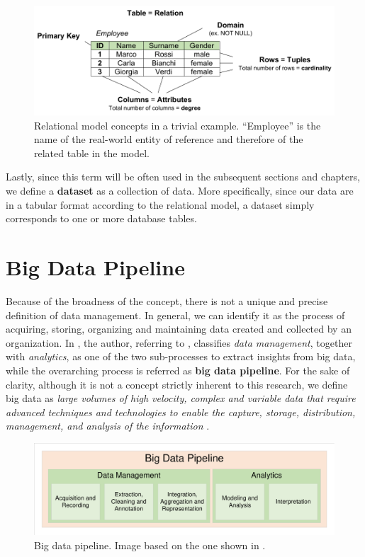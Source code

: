\begin{figure}[h!]
\includegraphics[scale=.75]{figures/relational_model.pdf}
\centering
\caption{Relational model concepts in a trivial example. ``Employee'' is the name of the real-world entity of reference and therefore of the related table in the model.}
\label{fig:relational_model}
\end{figure}

Lastly, since this term will be often used in the subsequent sections and chapters, we define a \textbf{dataset} as a collection of data. More specifically, since our data are in a tabular format according to the relational model, a dataset simply corresponds to one or more database tables.


\section{Big Data Pipeline}
Because of the broadness of the concept, there is not a unique and precise definition of data management. In general, we can identify it as the process of acquiring, storing, organizing and maintaining data created and collected by an organization. In \cite{gandomi2015beyond}, the author, referring to \cite{labrinidis2012challenges}, classifies \textit{data management}, together with \textit{analytics}, as one of the two sub-processes to extract insights from big data, while the overarching process is referred as \textbf{big data pipeline}. For the sake of clarity, although it is not a concept strictly inherent to this research, we define big data as \emph{large volumes of high velocity, complex and variable data that require advanced techniques and technologies to enable the capture, storage, distribution, management, and analysis of the information} \cite{mills2012demystifying}.

\begin{figure}[h!]
\includegraphics[scale=.5]{figures/big_data_pipeline.pdf}
\centering
\caption{Big data pipeline. Image based on the one shown in \cite{gandomi2015beyond}.}
\label{fig:big_data_pipeline}
\end{figure}

